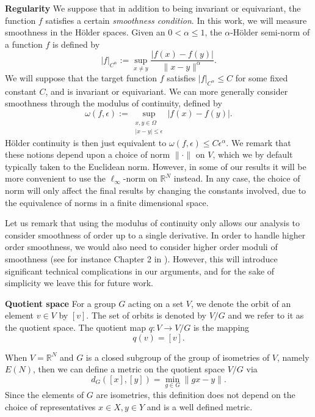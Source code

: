 \documentclass[twoside,11pt]{article}
\newcommand{\RR}{\mathbb{R}}
\begin{document}
\textbf{Regularity}
We suppose that in addition to being invariant or equivariant, the function $f$ satisfies a certain \emph{smoothness condition}. In this work, we will measure smoothness in the H\"older spaces. Given an $0 < \alpha \leq 1$, the $\alpha$-H\"older semi-norm of a function $f$ is defined by
\begin{equation}
	|f|_{C^\alpha} := \sup_{x\neq y} \frac{|f(x) - f(y)|}{\|x - y\|^\alpha}.
\end{equation}
We will suppose that the target function $f$ satisfies $|f|_{C^\alpha} \leq C$ for some fixed constant $C$, and is invariant or equivariant. We can more generally consider smoothness through the modulus of continuity, defined by
\begin{equation}\label{modulus-of-continuity-intro}
	\omega(f,\epsilon) := \sup_{\substack{x,y\in \Omega\\|x - y| \leq \epsilon}} |f(x) - f(y)|.
\end{equation}
H\"older continuity is then just equivalent to $\omega(f,\epsilon) \leq C\epsilon^{\alpha}$. We remark that these notions depend upon a choice of norm $\|\cdot\|$ on $V$, which we by default typically taken to the Euclidean norm. However, in some of our results  it will be more convenient to use the $\ell_\infty$-norm on $\RR^N$ instead. In any case, the choice of norm will only affect the final results by changing the constants involved, due to the equivalence of norms in a finite dimensional space.  
 
Let us remark that using the modulus of continuity only allows our analysis to consider smoothness of order up to a single derivative. In order to handle higher order smoothness, we would also need to consider higher order moduli of smoothness (see for instance Chapter 2 in \cite{devore1993constructive}). However, this will introduce significant technical complications in our arguments, and for the sake of simplicity we leave this for future work. 

\textbf{Quotient space} For a group $G$ acting on a set $V$, we denote the orbit of an element $v\in V$ by $[v]$. The set of orbits is denoted by $V/G$ and we refer to it as the quotient space. The quotient map $q:V\to V/G$ is the mapping 
$$q(v)=[v]. $$

When $V=\RR^N $ and $G$ is a closed subgroup of the group of isometries of $V$, namely $E(N)$, then we can define a metric on the quotient space $V/G$ via 
\begin{equation}\label{eq:dG}
d_G([x],[y])=\min_{g\in G} \|gx-y\| .
\end{equation}
Since the elements of $G$ are isometries, this definition does not depend on the choice of representatives $x\in X,y\in Y$ and is a well defined metric.  
\end{document}
